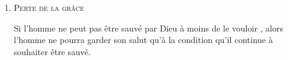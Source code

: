 \begin{enumerate}
  \item \textsc{Perte de la grâce}

Si l'homme ne peut pas être sauvé par Dieu à moins de le vouloir 
 ,
 alors l'homme ne pourra garder son salut qu'à la condition qu'il continue à souhaiter être sauvé.

\end{enumerate}




